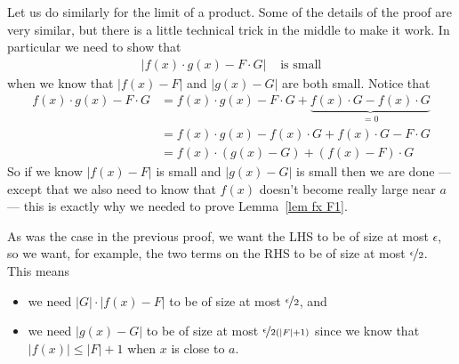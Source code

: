 Let us do similarly for the limit of a product. Some of the details of the
proof are very similar, but there is a little technical trick in the middle to
make it work. In particular we need to show that
\begin{align*}
  |f(x) \cdot g(x) - F\cdot G| & \text{ is small}
\end{align*}
when we know that $|f(x)-F|$ and $|g(x)-G|$ are both small. Notice that
\begin{align*}
  f(x) \cdot g(x) - F\cdot G
  &= f(x) \cdot g(x) - F\cdot G + \underbrace{ f(x)\cdot G - f(x) \cdot G
}_{=0} \\
  &= f(x)\cdot g(x)- f(x) \cdot G + f(x) \cdot G - F\cdot G \\
  &= f(x)\cdot( g(x)-G) + (f(x)-F)\cdot G
\end{align*}
So if we know $|f(x)-F|$ is small and $|g(x)-G|$ is small then we are done ---
except that we also need to know that $f(x)$ doesn't become really large near
$a$ --- this is exactly why we needed to prove Lemma~\ref{lem fx F1}.

As was the case in the previous proof, we want the LHS to be of size at most
$\epsilon$, so we want, for example,  the two terms on the RHS to be of size at most
$\nicefrac{\epsilon}{2}$. This means
\begin{itemize}
 \item we need $|G|\cdot|f(x)-F|$ to be of size at most $\nicefrac{\epsilon}{2}$, and
 \item we need $|g(x)-G|$ to be of size at most $\nicefrac{\epsilon}{2(|F|+1)}$
since we know that $|f(x)| \leq |F|+1$ when $x$ is close to $a$.
\end{itemize}

